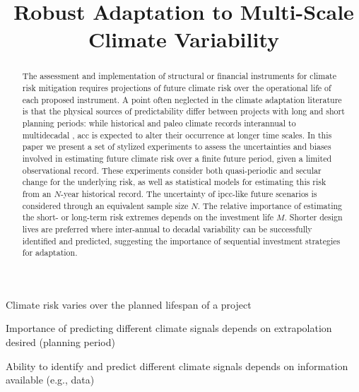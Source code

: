 \documentclass[
  draft,
  linenumbers
]{agujournal2018}
\makeatletter
\newcommand{\eg}{e.g.\@\xspace}
\makeatother
\begin{document}
\title{Robust Adaptation to Multi-Scale Climate Variability}

\begin{keypoints}
  \item Climate risk varies over the planned lifespan of a project
  \item Importance of predicting different climate signals depends on extrapolation desired (planning period)
  \item Ability to identify and predict different climate signals depends on information available (\eg, data)
\end{keypoints}

\begin{abstract}
  The assessment and implementation of structural or financial instruments for climate risk mitigation requires projections of future climate risk over the operational life of each proposed instrument.
  A point often neglected in the climate adaptation literature is that the physical sources of predictability differ between projects with long and short planning periods: while historical and paleo climate records   interannual to multidecadal  , \acrlong{acc} is expected to alter their occurrence at longer time scales.
  In this paper we present a set of stylized experiments to assess the uncertainties and biases involved in estimating future climate risk over a finite future period, given a limited observational record.
  These experiments consider both quasi-periodic and secular change for the underlying risk, as well as statistical models for estimating this risk from an $N$-year historical record.
  The uncertainty of \acrshort{ipcc}-like future scenarios is considered through an equivalent sample size $N$. 
  The relative importance of estimating the short- or long-term risk extremes depends on the investment life $M$.
  Shorter design lives are preferred  where inter-annual to decadal variability can be successfully identified and predicted, suggesting the importance of sequential investment strategies for adaptation. 
\end{abstract}
\end{document}
